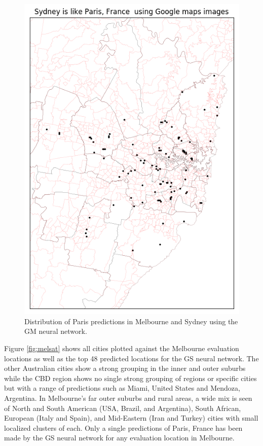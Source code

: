 \documentclass[sageh,times]{sagej}
\begin{document}
\begin{figure}[!htbp]
\includegraphics[scale=0.40]{Images/Sydney_Paris,France-GM.png} 
\caption{Distribution of Paris predictions in Melbourne and Sydney using the GM neural network.}    
 \label{fig:gm_melsyd_paris}  
\end{figure} 

Figure \ref{fig:melsat} shows all cities plotted against the Melbourne evaluation locations as well as the top 48 predicted locations for the GS neural network. The other Australian cities show a strong grouping in the inner and outer suburbs while the CBD region shows no single strong grouping of regions or specific cities but with a range of predictions such as Miami, United States and Mendoza, Argentina. In Melbourne's far outer suburbs and rural areas, a wide mix is seen of North and South American (USA, Brazil, and Argentina), South African, European (Italy and Spain), and Mid-Eastern (Iran and Turkey) cities with small localized clusters of each. Only a single predictions of Paris, France has been made by the GS neural network for any evaluation location in Melbourne.
\end{document}

